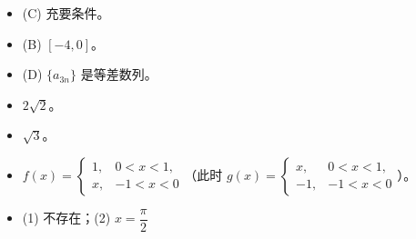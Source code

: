 \begin{itemize}[leftmargin=2.6em]
  \item[\textbf{30.}] (C) 充要条件。
  \item[\textbf{31.}] (B) \([-4,0]\)。
  \item[\textbf{32.}] (D) \(\{a_{3n}\}\) 是等差数列。
  \item[\textbf{33.}] \(2\sqrt{2}\)。
  \item[\textbf{34.}] \(\sqrt{3}\)。
  \item[\textbf{35.}] $f(x)=\begin{cases}1, & 0<x<1,\\ x, & -1<x<0\end{cases}$（此时 $g(x)=\begin{cases}x, & 0<x<1,\\ -1, & -1<x<0\end{cases}$）。
  \item[\textbf{36.}] (1) 不存在；(2) \(x=\dfrac{\pi}{2}\)
\end{itemize}
